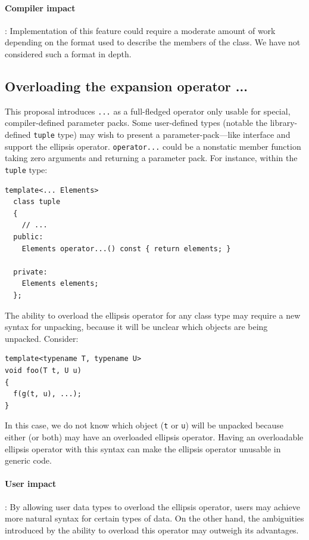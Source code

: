 \documentclass{article}
\begin{document}
\paragraph{Compiler impact}: Implementation of this feature could
require a moderate amount of work depending on the format used to
describe the members of the class. We have not considered such a
format in depth.

\subsection{Overloading the expansion operator ...}
This proposal introduces \texttt{...} as a full-fledged operator only
usable for special, compiler-defined parameter packs. Some
user-defined types (notable the library-defined \texttt{tuple} type)
may wish to present a parameter-pack---like interface and support the
ellipsis operator. \texttt{operator...} could be a nonstatic member
function taking zero arguments and returning a parameter pack. For
instance, within the \texttt{tuple} type:

\begin{verbatim}
template<... Elements>
  class tuple 
  {
    // ...
  public:
    Elements operator...() const { return elements; }

  private:
    Elements elements;
  };
\end{verbatim}

The ability to overload the ellipsis operator for any class type may
require a new syntax for unpacking, because it will be unclear which
objects are being unpacked. Consider:

\begin{verbatim}
template<typename T, typename U>
void foo(T t, U u)
{
  f(g(t, u), ...);
}
\end{verbatim}

In this case, we do not know which object (\texttt{t} or \texttt{u})
will be unpacked because either (or both) may have an overloaded
ellipsis operator. Having an overloadable ellipsis operator with this
syntax can make the ellipsis operator unusable in generic code.

\paragraph{User impact}: By allowing user data types to overload the
ellipsis operator, users may achieve more natural syntax for certain
types of data. On the other hand, the ambiguities introduced by the
ability to overload this operator may outweigh its advantages.
\end{document}
